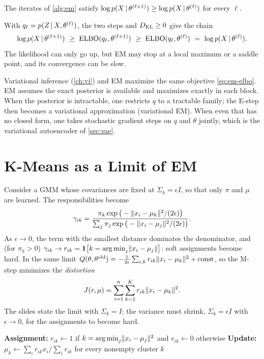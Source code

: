 \begin{proposition}[Monotonicity of EM]\label{prop:em-monotone}
The iterates of \cref{alg:em} satisfy $\log p(X\,|\,\theta^{(\ell+1)})\ge\log p(X\,|\,\theta^{(\ell)})$ for every $\ell$.
\end{proposition}

With $q_\ell=p(Z\,|\, X,\theta^{(\ell)})$, the two steps and $D_{\mathrm{KL}}\ge0$ give the chain
\[
\log p(X\given\theta^{(\ell+1)})\ \ge\ \ELBO(q_\ell,\theta^{(\ell+1)})\ \ge\ \ELBO(q_\ell,\theta^{(\ell)})\ =\ \log p(X\given\theta^{(\ell)}).
\]
The likelihood can only go up, but EM may stop at a local maximum or a saddle point, and its convergence can be slow.

\begin{remark}\label{rem:vi-vs-em}
Variational inference (\cref{ch:vi}) and EM maximize the same objective \eqref{eq:em-elbo}. EM assumes the exact posterior is available and maximizes exactly in each block. When the posterior is intractable, one restricts $q$ to a tractable family; the E-step then becomes a variational approximation (variational EM). When even that has no closed form, one takes stochastic gradient steps on $q$ and $\theta$ jointly, which is the variational autoencoder of \cref{sec:vae}.
\end{remark}

\section{K-Means as a Limit of EM}\label{sec:kmeans}

Consider a GMM whose covariances are fixed at $\Sigma_k=\epsilon I$, so that only $\pi$ and $\mu$ are learned. The responsibilities become
\[
\gamma_{ik}=\frac{\pi_k\exp\big(-\lVert x_i-\mu_k\rVert^2/(2\epsilon)\big)}{\sum_j\pi_j\exp\big(-\lVert x_i-\mu_j\rVert^2/(2\epsilon)\big)}.
\]
As $\epsilon\to0$, the term with the smallest distance dominates the denominator, and (for $\pi_k>0$) $\gamma_{ik}\to r_{ik}=\mathbf{1}\big[k=\operatorname*{arg\,min}_j\lVert x_i-\mu_j\rVert\big]$: soft assignments become hard. In the same limit $Q(\theta,\theta^{\mathrm{old}})=-\frac1{2\epsilon}\sum_{i,k}r_{ik}\lVert x_i-\mu_k\rVert^2+\text{const}$, so the M-step minimizes the \emph{distortion}
\[
J(r,\mu)=\sum_{i=1}^n\sum_{k=1}^Kr_{ik}\lVert x_i-\mu_k\rVert^2 .
\]
The slides state the limit with $\Sigma_k=I$; the variance must shrink, $\Sigma_k=\epsilon I$ with $\epsilon\to0$, for the assignments to become hard.

\begin{algorithm}[H]
\caption{K-Means}\label{alg:kmeans}
\begin{algorithmic}[1]
\Repeat
  \State \textbf{Assignment:} $r_{ik}\gets1$ if $k=\operatorname*{arg\,min}_j\lVert x_i-\mu_j\rVert^2$ and $r_{ik}\gets0$ otherwise 
  \State \textbf{Update:} $\mu_k\gets\sum_ir_{ik}x_i\big/\sum_ir_{ik}$ for every nonempty cluster $k$ 
\end{algorithmic}
\end{algorithm}

